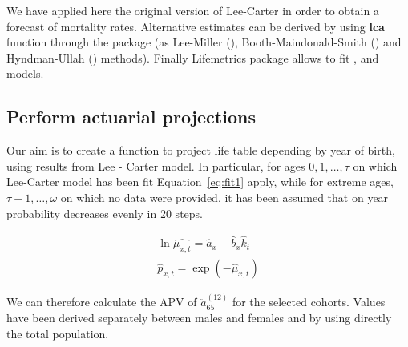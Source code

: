 \documentclass[nojss]{jss}
\begin{document}
We have applied here the original version of Lee-Carter in order to obtain a forecast of mortality rates.
Alternative estimates can be derived by using \textbf{lca} function through the  package (as Lee-Miller (\cite{LM}), Booth-Maindonald-Smith (\cite{BMS}) and Hyndman-Ullah (\cite{Hyn}) methods).
Finally Lifemetrics package allows to fit  \cite{BDV}, \cite{RH} and \cite{CBD} models.

\subsection{Perform actuarial projections}
Our aim is to create a function to project life table depending by year of birth,
using results from Lee - Carter model. 
In particular, for ages $0, 1, \ldots, \tau$ on which Lee-Carter model has been fit Equation~\ref{eq:fit1} apply, while for extreme
ages, $\tau + 1, \ldots, \omega$ on which no data were provided, it has been
assumed that on year probability decreases evenly in 20 steps.

\begin{equation}
\begin{array}{l}
\ln {\hat{\mu_{x,t}}} = \hat{a}_{x} + \hat{b}_{x}\hat{k}_{t}\\
\hat{p}_{x,t} = \exp \left(- \hat {\mu }_{x,t} \right)
\end{array}
\label{eq:fit1}
\end{equation}



\begin{Schunk}
\end{Schunk}

We can therefore calculate the APV of $\ddot{a}_{65}^{(12)}$ for the selected cohorts.
Values have been derived separately between males and females and by using directly the total population.
\end{document}
